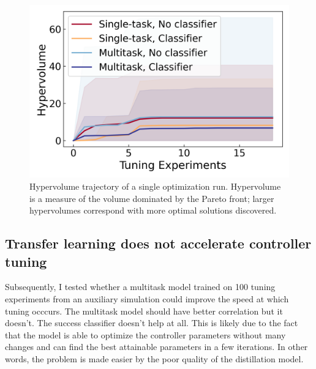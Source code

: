 \begin{figure}
    \centering
    \includegraphics[width=\textwidth]{gfx/Chapter06/hypervolume_comparison.png}
    \caption{Hypervolume trajectory of a single optimization run. Hypervolume is a measure of the volume dominated by the Pareto front; larger hypervolumes correspond with more optimal solutions discovered.}
    \label{fig:hypervolume_comparison}
\end{figure}






\subsection{Transfer learning does not accelerate controller tuning}

Subsequently, I tested whether a multitask model trained on 100 tuning experiments from an auxiliary simulation could improve the speed at which tuning occcurs. The multitask model should have better correlation but it doesn't. The success classifier doesn't help at all. This is likely due to the fact that the model is able to optimize the controller parameters without many changes and can find the best attainable parameters in  a few iterations. In other words, the problem is made easier by the poor quality of the distillation model.

